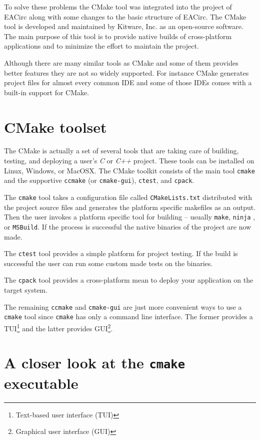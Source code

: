 \documentclass[12pt,oneside]{fithesis2}
\begin{document}
To solve these problems the CMake \cite{cmake} tool was integrated into the project of EACirc along with some changes to the basic structure of EACirc. The CMake tool is developed and maintained by Kitware, Inc. \cite{kitware} as an open-source software. The main purpose of this tool is to provide native builds of cross-platform applications and to minimize the effort to maintain the project.

Although there are many similar tools as CMake and some of them provides better features they are not so widely supported. For instance CMake generates project files for almost every common IDE and some of those IDEs comes with a built-in support for CMake.

\section{CMake toolset}

The CMake is actually a set of several tools that are taking care of building, testing, and deploying a user's \emph{C} or \emph{C++} project. These tools can be installed on Linux, Windows, or MacOSX. The CMake toolkit consists of the main tool \texttt{cmake} and the supportive \texttt{ccmake} (or \texttt{cmake-gui}), \texttt{ctest}, and \texttt{cpack}.

The \texttt{cmake} tool takes a configuration file called \texttt{CMakeLists.txt} distributed with the project source files and generates the platform specific makefiles as an output. Then the user invokes a platform specific tool for building -- usually \texttt{make}, \texttt{ninja} \cite{ninja}, or \texttt{MSBuild}. \cite{msbuild} If the process is successful the native binaries of the project are now made.

The \texttt{ctest} tool provides a simple platform for project testing. If the build is successful the user can run some custom made tests on the binaries.

The \texttt{cpack} tool provides a cross-platform mean to deploy your application on the target system.

The remaining \texttt{ccmake} and \texttt{cmake-gui} are just more convenient ways to use a \texttt{cmake} tool since \texttt{cmake} has only a command line interface. The former provides a TUI\footnote{Text-based user interface (TUI)} and the latter provides GUI\footnote{Graphical user interface (GUI)}.

\section{A closer look at the \texttt{cmake} executable}
\end{document}
